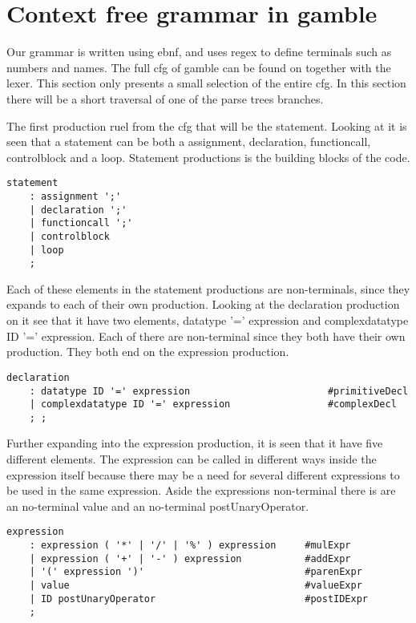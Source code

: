 \section{Context free grammar in gamble}
Our grammar is written using \acrfull{ebnf}, and uses \acrfull{regex} to define terminals such as numbers and names.
The full \acrshort{cfg} of \gls{gamble} can be found on  together with the lexer. This section only presents a small selection of the entire \acrshort{cfg}.
In this section there will be a short traversal of one of the parse trees branches.

The first production ruel from the \acrshort{cfg} that will be the statement. 
Looking at  it is seen that a statement can be both a assignment, declaration, functioncall, controlblock and a loop. 
Statement productions is the building blocks of the code.

\begin{lstlisting}[caption={\acrshort{cfg} Statement},frame=tlrb,label={lst:statements},numbers=none]
statement
    : assignment ';'
    | declaration ';'
    | functioncall ';'
    | controlblock
    | loop
    ;
\end{lstlisting}

Each of these elements in the statement productions are non-terminals, since they expands to each of their own production.
Looking at the declaration production on  it see that it have two elements, datatype '=' expression and complexdatatype ID '=' expression.
Each of there are non-terminal since they both have their own production. They both end on the expression production.

\begin{lstlisting}[caption={\acrshort{cfg} Declaration},frame=tlrb,label={lst:declaration},numbers=none]
declaration
    : datatype ID '=' expression                        #primitiveDecl
    | complexdatatype ID '=' expression                 #complexDecl
    ; ;
\end{lstlisting}

Further expanding into the expression production, it is seen that it have five different elements.
The expression can be called in different ways inside the expression itself because there may be a need for several different expressions to be used in the same expression.
Aside the expressions non-terminal there is are an no-terminal value and an no-terminal postUnaryOperator.
\begin{lstlisting}[caption={\acrshort{cfg} Expression},frame=tlrb,label={lst:expression},numbers=none]
expression
    : expression ( '*' | '/' | '%' ) expression     #mulExpr
    | expression ( '+' | '-' ) expression           #addExpr
    | '(' expression ')'                            #parenExpr
    | value                                         #valueExpr
    | ID postUnaryOperator                          #postIDExpr
    ;
\end{lstlisting}
  
